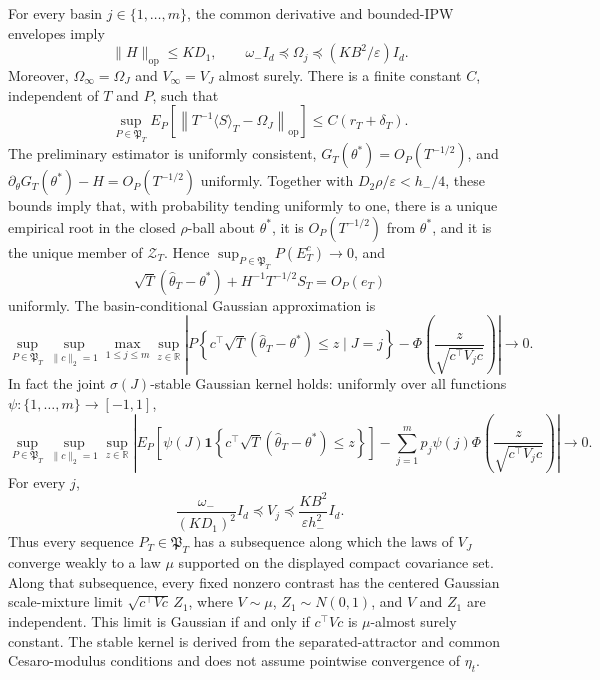 For every basin \(j\in\{1,\ldots,m\}\), the common derivative and bounded-IPW envelopes imply
\[
 \|H\|_{\mathrm{op}}\le KD_1,
 \qquad
 \omega_-I_d\preceq\Omega_j\preceq(KB^2/\varepsilon)I_d.
\]
Moreover, \(\Omega_\infty=\Omega_J\) and \(V_\infty=V_J\) almost surely. There is a finite constant \(C\), independent of \(T\) and \(P\), such that
\[
 \sup_{P\in\mathfrak P_T}E_P\!\left[\left\|T^{-1}\langle S\rangle_T-\Omega_J\right\|_{\mathrm{op}}\right]
 \le C(r_T+\delta_T).
\]
The preliminary estimator is uniformly consistent, \(G_T(\theta^*)=O_P(T^{-1/2})\), and \(\partial_\theta G_T(\theta^*)-H=O_P(T^{-1/2})\) uniformly. Together with \(D_2\rho/\varepsilon<h_-/4\), these bounds imply that, with probability tending uniformly to one, there is a unique empirical root in the closed \(\rho\)-ball about \(\theta^*\), it is \(O_P(T^{-1/2})\) from \(\theta^*\), and it is the unique member of \(\mathcal Z_T\). Hence \(\sup_{P\in\mathfrak P_T}P(E_T^c)\to0\), and
\[
 \sqrt T(\widehat\theta_T-\theta^*)+H^{-1}T^{-1/2}S_T=O_P(e_T)
\]
uniformly. The basin-conditional Gaussian approximation is
\[
 \sup_{P\in\mathfrak P_T}\sup_{\|c\|_2=1}\max_{1\le j\le m}\sup_{z\in\mathbb R}
 \left|P\left\{c^\top\sqrt T(\widehat\theta_T-\theta^*)\le z\mid J=j\right\}
 -\Phi\left(\frac{z}{\sqrt{c^\top V_jc}}\right)\right|\longrightarrow0.
\]
In fact the joint \(\sigma(J)\)-stable Gaussian kernel holds: uniformly over all functions \(\psi:\{1,\ldots,m\}\to[-1,1]\),
\[
 \sup_{P\in\mathfrak P_T}\sup_{\|c\|_2=1}\sup_{z\in\mathbb R}
 \left|E_P\!\left[\psi(J)\mathbf 1\!\left\{c^\top\sqrt T(\widehat\theta_T-\theta^*)\le z\right\}\right]
 -\sum_{j=1}^mp_j\psi(j)\Phi\left(\frac{z}{\sqrt{c^\top V_jc}}\right)\right|\longrightarrow0.
\]
For every \(j\),
\[
 \frac{\omega_-}{(KD_1)^2}I_d\preceq V_j
 \preceq\frac{KB^2}{\varepsilon h_-^2}I_d.
\]
Thus every sequence \(P_T\in\mathfrak P_T\) has a subsequence along which the laws of \(V_J\) converge weakly to a law \(\mu\) supported on the displayed compact covariance set. Along that subsequence, every fixed nonzero contrast has the centered Gaussian scale-mixture limit \(\sqrt{c^\top Vc}\,Z_1\), where \(V\sim\mu\), \(Z_1\sim N(0,1)\), and \(V\) and \(Z_1\) are independent. This limit is Gaussian if and only if \(c^\top Vc\) is \(\mu\)-almost surely constant. The stable kernel is derived from the separated-attractor and common Cesaro-modulus conditions and does not assume pointwise convergence of \(\eta_t\).